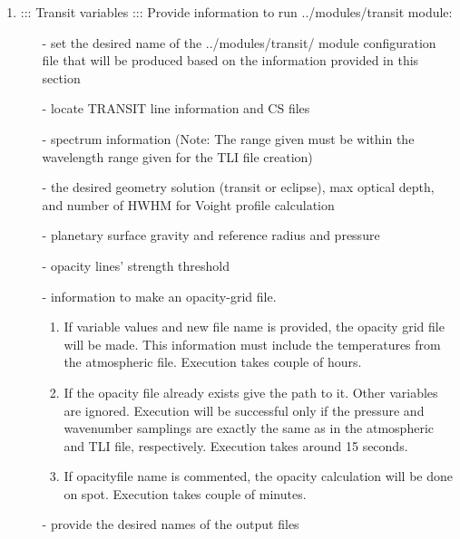 \documentclass[letterpaper, 12pt]{article}
\begin{document}
\begin{enumerate}
\item ::: Transit variables  :::
     Provide information to run ../modules/transit module:
     \begin{enumerate}
    \item[-]set the desired name of the ../modules/transit/ module
         configuration file that will be produced based on the
         information provided in this section
    \item[-]locate TRANSIT line information and CS files
    \item[-]spectrum information (Note: The range given must be within
         the wavelength range given for the TLI file creation)
    \item[-]the desired geometry solution (transit or eclipse),
         max optical depth, and number of HWHM for Voight profile
         calculation
    \item[-]planetary surface gravity and reference radius and pressure
    \item[-]opacity lines' strength threshold
    \item[-]information to make an opacity-grid file.
        \begin{enumerate}
        \item If variable values and new file name is provided,
            the opacity grid file will be made. This information
            must include the temperatures from the atmospheric file.
            Execution takes couple of hours.
        \item If the opacity file already exists give the path to it.
            Other variables are ignored. Execution will be successful
            only if the pressure and wavenumber samplings are exactly
            the same as in the atmospheric and TLI file, respectively.
            Execution takes around 15 seconds.
        \item If opacityfile name is commented, the opacity calculation
            will be done on spot. Execution takes couple of minutes.
        \end{enumerate}
    \item[-]provide the desired names of the output files
    \end{enumerate}
\end{enumerate}

\end{document}
